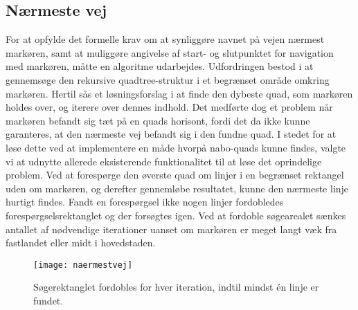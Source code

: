 \subsection{Nærmeste vej}
For at opfylde det formelle krav om at synliggøre navnet på vejen nærmest markøren, samt at muliggøre angivelse af start- og slutpunktet for navigation med markøren, måtte en algoritme udarbejdes. Udfordringen bestod i at gennemsøge den rekursive quadtree-struktur i et begrænset område omkring markøren. Hertil sås et løsningsforslag i at finde den dybeste quad, som markøren holdes over, og iterere over dennes indhold. Det medførte dog et problem når markøren befandt sig tæt på en quads horisont, fordi det da ikke kunne garanteres, at den nærmeste vej befandt sig i den fundne quad. I stedet for at løse dette ved at implementere en måde hvorpå nabo-quads kunne findes, valgte vi at udnytte allerede eksisterende funktionalitet til at løse det oprindelige problem. Ved at forespørge den øverste quad om linjer i en begrænset rektangel uden om markøren, og derefter gennemløbe resultatet, kunne den nærmeste linje hurtigt findes. Fandt en forespørgsel ikke nogen linjer fordobledes forespørgselsrektanglet og der forsøgtes igen. Ved at fordoble søgearealet sænkes antallet af nødvendige iterationer uanset om markøren er meget langt væk fra fastlandet eller midt i hovedstaden.
\begin{figure}[ht]
	\centering
	\texttt{[image: naermestvej]}
	\captionsetup{width=0.8\textwidth}
	\caption{Søgerektanglet fordobles for hver iteration, indtil mindst én linje er fundet.}
	\label{fig:naermestvej}
\end{figure}
